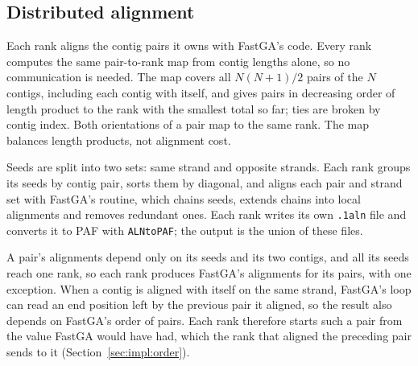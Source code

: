 \subsection{Distributed alignment}\label{sec:alg:alignment}
Each rank aligns the contig pairs it owns with FastGA's code. Every rank
computes the same pair-to-rank map from contig lengths alone, so no
communication is needed. The map covers all $N(N+1)/2$ pairs of the $N$
contigs, including each contig with itself, and gives pairs in decreasing
order of length product to the rank with the smallest total so far; ties
are broken by contig index. Both orientations of a pair map to the same
rank. The map balances length products, not alignment cost.

Seeds are split into two sets: same strand and opposite strands. Each rank
groups its seeds by contig pair, sorts them by diagonal, and
aligns each pair and strand set with FastGA's routine, which chains seeds,
extends chains into local alignments and removes redundant ones. Each rank
writes its own \texttt{.1aln} file and converts it to PAF with
\texttt{ALNtoPAF}; the output is the union of these files.

A pair's alignments depend only on its seeds and its two contigs, and all
its seeds reach one rank, so each rank produces FastGA's alignments for its
pairs, with one exception. When a contig is aligned with itself on the same
strand, FastGA's loop can read an end position left by the previous pair it
aligned, so the result also depends on FastGA's order of pairs. Each rank
therefore starts such a pair from the value FastGA would have had, which
the rank that aligned the preceding pair sends to it
(Section~\ref{sec:impl:order}).
